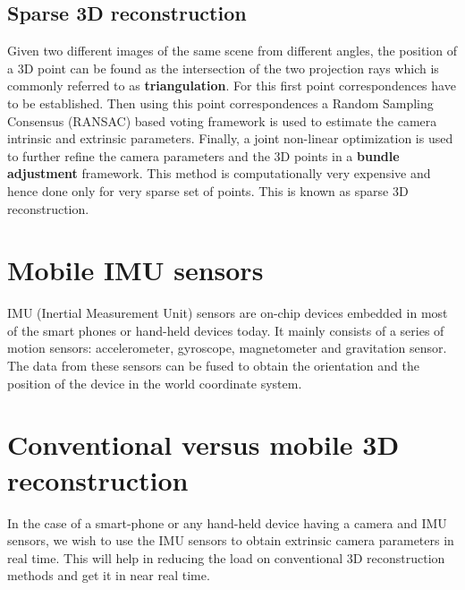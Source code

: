 \documentclass{article}
\begin{document}
			\subsection{Sparse 3D reconstruction} 
				Given two different images of the same scene from different angles, the position of a 3D point can be found as the intersection of the two projection rays which is commonly referred to as \textbf{triangulation}. For this first point correspondences have to be established. Then using this point correspondences a Random Sampling Consensus (RANSAC) based voting framework is used to estimate the camera intrinsic and extrinsic parameters. Finally, a joint non-linear optimization is used to further refine the camera parameters and the 3D points in a \textbf{bundle adjustment} framework. This method is computationally very expensive and hence done only for very sparse set of points. This is known as sparse 3D reconstruction.

			\section{Mobile IMU sensors}
				IMU (Inertial Measurement Unit) sensors are on-chip devices embedded in most of the smart phones or hand-held devices today. It mainly consists of a series of motion sensors: accelerometer, gyroscope, magnetometer and gravitation sensor. The data from these sensors can be fused to obtain the orientation and the position of the device in the world coordinate system.

			\section{Conventional versus mobile 3D reconstruction}
				In the case of a smart-phone or any hand-held device having a camera and IMU sensors, we wish to use  the IMU sensors to obtain extrinsic camera parameters in real time. This will help in reducing the load on conventional 3D reconstruction methods and get it in near real time.
\end{document}
